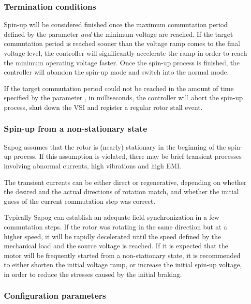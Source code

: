 \documentclass{zubaxdoc}
\begin{document}
\subsubsection{Termination conditions}

Spin-up will be considered finished once the maximum commutation period defined by the parameter
 \emph{and} the minimum voltage  are reached.
If the target commutation period is reached sooner than the voltage ramp comes to the final
voltage level, the controller will significantly accelerate the ramp in order to reach
the minimum operating voltage faster.
Once the spin-up process is finished,
the controller will abandon the spin-up mode and switch into the normal mode.

If the target commutation period could not be reached in the amount of time specified by
the parameter , in milliseconds, the controller will abort the spin-up process,
shut down the VSI and register a regular rotor stall event.

\subsubsection{Spin-up from a non-stationary state}

Sapog assumes that the rotor is (nearly) stationary in the beginning of the spin-up process.
If this assumption is violated, there may be brief transient processes involving abnormal currents,
high vibrations and high EMI.

The transient currents can be either direct or regenerative, depending on whether the desired
and the actual directions of rotation match, and whether the initial guess of the current
commutation step was correct.

Typically Sapog can establish an adequate field synchronization in a few commutation steps.
If the rotor was rotating in the same direction but at a higher speed,
it will be rapidly decelerated until the speed defined by the mechanical load and the source voltage is
reached.
If it is expected that the motor will be frequently started from a non-stationary state,
it is recommended to either shorten the initial voltage ramp, or increase the initial
spin-up voltage, in order to reduce the stresses caused by the initial braking.

\subsubsection{Configuration parameters}
\end{document}
